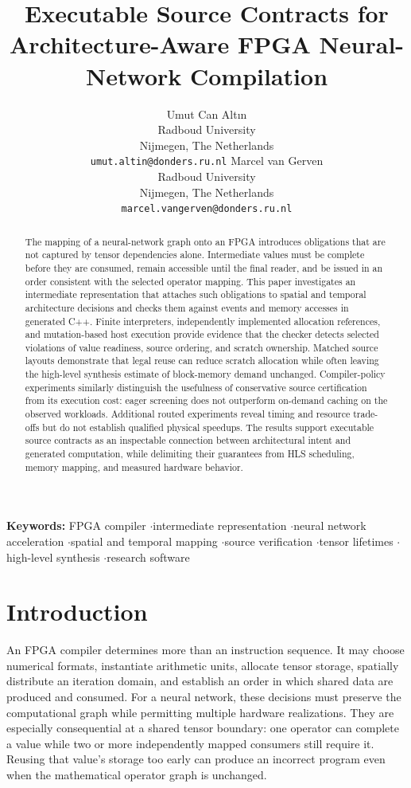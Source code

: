 \documentclass{article}
\title{Executable Source Contracts for Architecture-Aware FPGA Neural-Network Compilation}
\author{%
{\normalfont\large Umut Can Alt\i{}n} \\[2pt]
{\normalfont\normalsize Radboud University} \\
{\normalfont\normalsize Nijmegen, The Netherlands} \\
{\normalfont\small\texttt{umut.altin@donders.ru.nl}} 
\PaperAuthorSep
{\normalfont\large Marcel van Gerven} \\[2pt]
{\normalfont\normalsize Radboud University} \\
{\normalfont\normalsize Nijmegen, The Netherlands} \\
{\normalfont\small\texttt{marcel.vangerven@donders.ru.nl}}%
}
\date{}
\providecommand{\keywords}[1]{\par\medskip\noindent\textbf{Keywords:} \begingroup\def\and{\unskip\space$\cdot$\space}#1\endgroup\par}
\begin{document}
\maketitle
\begin{abstract}
The mapping of a neural-network graph onto an FPGA introduces obligations that are not captured by tensor dependencies alone. Intermediate values must be complete before they are consumed, remain accessible until the final reader, and be issued in an order consistent with the selected operator mapping. This paper investigates an intermediate representation that attaches such obligations to spatial and temporal architecture decisions and checks them against events and memory accesses in generated C++. Finite interpreters, independently implemented allocation references, and mutation-based host execution provide evidence that the checker detects selected violations of value readiness, source ordering, and scratch ownership. Matched source layouts demonstrate that legal reuse can reduce scratch allocation while often leaving the high-level synthesis estimate of block-memory demand unchanged. Compiler-policy experiments similarly distinguish the usefulness of conservative source certification from its execution cost: eager screening does not outperform on-demand caching on the observed workloads. Additional routed experiments reveal timing and resource trade-offs but do not establish qualified physical speedups. The results support executable source contracts as an inspectable connection between architectural intent and generated computation, while delimiting their guarantees from HLS scheduling, memory mapping, and measured hardware behavior.
\end{abstract}

\keywords{FPGA compiler \and intermediate representation \and neural network acceleration \and spatial and temporal mapping \and source verification \and tensor lifetimes \and high-level synthesis \and research software}

\section{Introduction}
An FPGA compiler determines more than an instruction sequence. It may choose numerical formats, instantiate arithmetic units, allocate tensor storage, spatially distribute an iteration domain, and establish an order in which shared data are produced and consumed. For a neural network, these decisions must preserve the computational graph while permitting multiple hardware realizations. They are especially consequential at a shared tensor boundary: one operator can complete a value while two or more independently mapped consumers still require it. Reusing that value's storage too early can produce an incorrect program even when the mathematical operator graph is unchanged.
\end{document}
